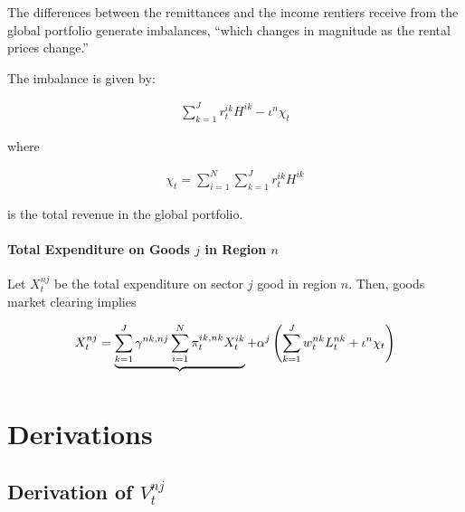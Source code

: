 \documentclass[10pt]{article}
\begin{document}
The differences between the 
remittances and the income 
rentiers receive from the global portfolio
generate imbalances, ``which changes in magnitude 
as the rental prices change.''

The imbalance is given by:

\begin{align}
    \sum_{k=1}^J r_t^{i k} H^{i k}-\iota^n \chi_t
\end{align}

where 

\begin{align}
    \chi_t=\sum_{i=1}^N \sum_{k=1}^J r_t^{i k} H^{i k}
\end{align}

is the total revenue in the global portfolio.

\paragraph{Total Expenditure on Goods $j$ in Region $n$}

Let $X_t^{n j}$ be the total expenditure on sector $j$ good in region $n$. Then, goods market clearing implies

\begin{align}
    X_t^{n j}=\underbrace{\sum_{k=1}^J \gamma^{n k, n j} \sum_{i=1}^N \pi_t^{i k, n k} X_t^{i k}}_{\parbox[t]{2cm}{\raggedright \footnotesize \centering }}+
        \alpha^j\left(\sum_{k=1}^J w_t^{n k} L_t^{n k}+\iota^n \chi_t\right)
\end{align}



\section{Derivations}


\subsection{Derivation of $V_t^{n j}$}
\label{sec:V_t_nj_exp}
\end{document}
